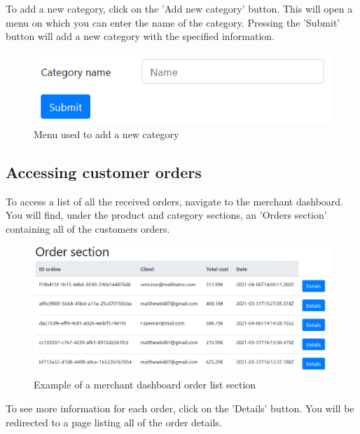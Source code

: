 To add a new category, click on the 'Add new category' button. This will open a menu on which you can enter the name of the category. Pressing the 'Submit' button will add a new category with the specified information.

\begin{figure}[H]
\centering
\includegraphics[scale=0.6]{res/Immagini/AddCategory}
\caption{Menu used to add a new category}
\end{figure}

\subsection{Accessing customer orders}
To access a list of all the received orders, navigate to the merchant dashboard. You will find, under the product and category sections, an 'Orders section' containing all of the customers orders.

\begin{figure}[H]
\centering
\includegraphics[scale=0.6]{res/Immagini/MerchantOrderList}
\caption{Example of a merchant dashboard order list section}
\end{figure}

To see more information for each order, click on the 'Details' button. You will be redirected to a page listing all of the order details.
